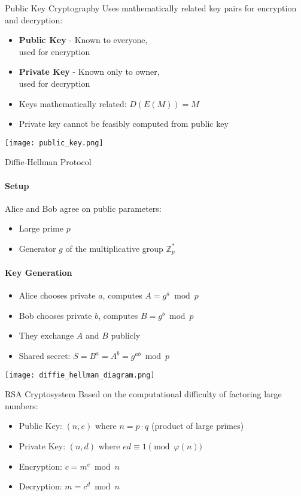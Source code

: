 
\begin{definition}{Public Key Cryptography}
    Uses mathematically related key pairs for encryption and decryption:
    \begin{itemize}
        \item \textbf{Public Key} - Known to everyone, \\used for encryption
        \item \textbf{Private Key} - Known only to owner, \\used for decryption
        \item Keys mathematically related: $D(E(M)) = M$
        \item Private key cannot be feasibly computed from public key
    \end{itemize}
    \texttt{[image: public\_key.png]}
\end{definition}

\begin{KR}{Diffie-Hellman Protocol}
    \paragraph{Setup}
    Alice and Bob agree on public parameters:
    \begin{itemize}
        \item Large prime $p$
        \item Generator $g$ of the multiplicative group $\mathbb{Z}_p^*$
    \end{itemize}
    
    \paragraph{Key Generation}
    \begin{itemize}
        \item Alice chooses private $a$, computes $A = g^a \bmod p$
        \item Bob chooses private $b$, computes $B = g^b \bmod p$
        \item They exchange $A$ and $B$ publicly
        \item Shared secret: $S = B^a = A^b = g^{ab} \bmod p$
    \end{itemize}
    \texttt{[image: diffie\_hellman\_diagram.png]}
\end{KR}

\begin{definition}{RSA Cryptosystem}
    Based on the computational difficulty of factoring large numbers:
    \begin{itemize}
        \item Public Key: $(n, e)$ where $n = p \cdot q$ (product of large primes)
        \item Private Key: $(n, d)$ where $ed \equiv 1 \pmod{\varphi(n)}$
        \item Encryption: $c = m^e \bmod n$
        \item Decryption: $m = c^d \bmod n$
    \end{itemize}
\end{definition}

\multend




